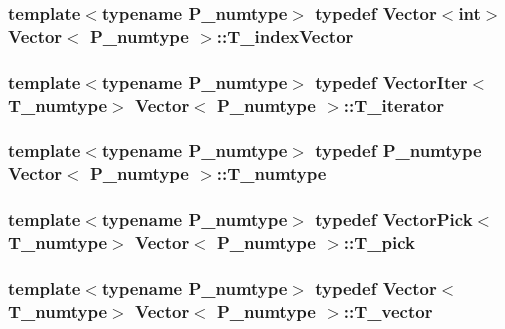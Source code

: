 \subsubsection[{T\+\_\+index\+Vector}]{\setlength{\rightskip}{0pt plus 5cm}template$<$typename P\+\_\+numtype$>$ typedef {\bf Vector}$<$int$>$ {\bf Vector}$<$ P\+\_\+numtype $>$\+::{\bf T\+\_\+index\+Vector}}\label{classVector_aa02a1323b0f3ca8c6cc82732fad69768}
\hypertarget{classVector_a3595565cd5a82f30d054fe37d0aaa802}{}
\subsubsection[{T\+\_\+iterator}]{\setlength{\rightskip}{0pt plus 5cm}template$<$typename P\+\_\+numtype$>$ typedef {\bf Vector\+Iter}$<${\bf T\+\_\+numtype}$>$ {\bf Vector}$<$ P\+\_\+numtype $>$\+::{\bf T\+\_\+iterator}}\label{classVector_a3595565cd5a82f30d054fe37d0aaa802}
\hypertarget{classVector_a63dfe9fb06d8b4595b9e8fb10fc0755e}{}
\subsubsection[{T\+\_\+numtype}]{\setlength{\rightskip}{0pt plus 5cm}template$<$typename P\+\_\+numtype$>$ typedef P\+\_\+numtype {\bf Vector}$<$ P\+\_\+numtype $>$\+::{\bf T\+\_\+numtype}}\label{classVector_a63dfe9fb06d8b4595b9e8fb10fc0755e}
\hypertarget{classVector_a5fbb048b36ae3897d8b0c6d993b33a9d}{}
\subsubsection[{T\+\_\+pick}]{\setlength{\rightskip}{0pt plus 5cm}template$<$typename P\+\_\+numtype$>$ typedef {\bf Vector\+Pick}$<${\bf T\+\_\+numtype}$>$ {\bf Vector}$<$ P\+\_\+numtype $>$\+::{\bf T\+\_\+pick}}\label{classVector_a5fbb048b36ae3897d8b0c6d993b33a9d}
\hypertarget{classVector_a29e279edfeac4d65aad0d814c05cfaf0}{}
\subsubsection[{T\+\_\+vector}]{\setlength{\rightskip}{0pt plus 5cm}template$<$typename P\+\_\+numtype$>$ typedef {\bf Vector}$<${\bf T\+\_\+numtype}$>$ {\bf Vector}$<$ P\+\_\+numtype $>$\+::{\bf T\+\_\+vector}}\label{classVector_a29e279edfeac4d65aad0d814c05cfaf0}


